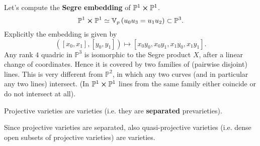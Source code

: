 \begin{ex}
	Let's compute the \textbf{Segre embedding} of $\mathbb{P}^{1} \cross \mathbb{P}^{1}$.
	\begin{equation}
	\mathbb{P}^{1} \cross \mathbb{P}^{1} \simeq \mathbb{V}_p\left( u_0 u_3 = u_1 u_2 \right) \subset \mathbb{P}^{3}
	.\end{equation} 
	Explicitly the embedding is given by
	\begin{equation}
	\left(\left[ x_0, x_1 \right], \left[ y_0, y_1 \right]\right) \mapsto \left[ x_0y_0, x_0y_1, x_1y_0, x_1y_1 \right]
	.\end{equation} 
	Any rank $4$ quadric in $\mathbb{P}^{3}$ is isomorphic to the Segre product $X$, after a linear change of coordinates.
	Hence it is covered by two families of (pairwise disjoint) lines.
	This is very different from $\mathbb{P}^{2}$, in which any two curves (and in particular any two lines) intersect.
	(In $\mathbb{P}^{1} \cross \mathbb{P}^{1}$ lines from the same family either coincide or do not intersect at all).
\end{ex} 

\begin{prop}[Corollary]
	Projective varieties are varieties (i.e. they are \textbf{separated} prevarieties).
\end{prop} 
\begin{rem}
	Since projective varieties are separated, also quasi-projective varieties
	(i.e. dense open subsets of projective varieties) are varieties.
\end{rem}
